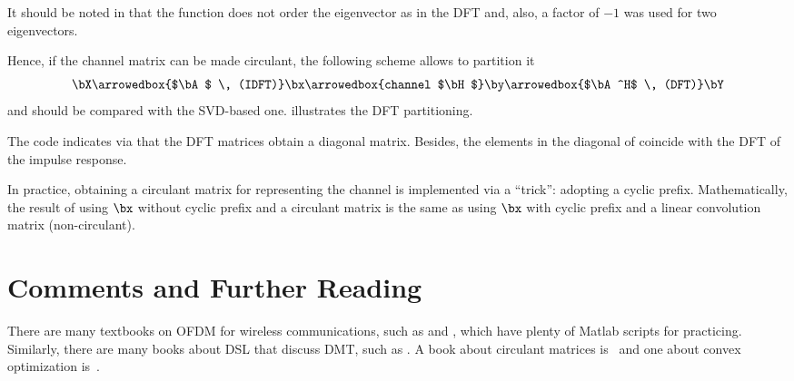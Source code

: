 It should be noted in  that the function  does not order the eigenvector as in the DFT and, also, a factor of $-1$ was used for two eigenvectors.

Hence, if the channel matrix can be made circulant, the following scheme allows to partition it
\[
\bX \arrowedbox{$\bA$ \, (IDFT)} \bx \arrowedbox{channel $\bH$} \by \arrowedbox{$\bA^H$ \, (DFT)} \bY
\]
and should be compared with the SVD-based one.  illustrates the DFT partitioning.


The code indicates via  that the DFT matrices obtain a diagonal matrix. Besides, the elements in the diagonal of  coincide with the DFT of the impulse response.

In practice, obtaining a circulant matrix for representing the channel is implemented via a ``trick'': adopting a cyclic prefix. Mathematically, the result of using $\bx$ without cyclic prefix and a circulant matrix is the same as using $\bx$ with cyclic prefix and a linear convolution matrix (non-circulant).
\eApplication

\section{Comments and Further Reading}

There are many textbooks on OFDM for wireless communications, such as \cite{Prasad04} and \cite{Cho10}, which have plenty of Matlab scripts for practicing.
Similarly, there are many books about DSL that discuss DMT, such as \cite{Summers99,Starr99,Starr03,Golden06,Golden07}.
A book about circulant matrices is~\cite{Davis79} and one about convex optimization is~\cite{Boyd04}.

